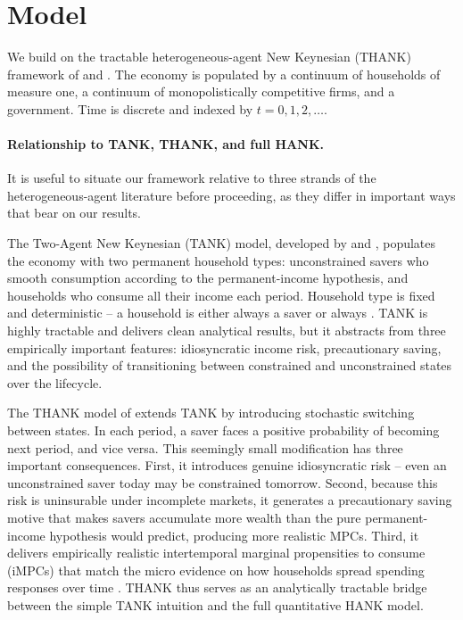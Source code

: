 \section{Model}\label{sec:model}

We build on the tractable heterogeneous-agent New Keynesian (THANK) framework
of \citet{Bilbiie2021} and \citet{Bilbiie2025}. The economy is populated by a
continuum of households of measure one, a continuum of monopolistically
competitive firms, and a government. Time is discrete and indexed by
$t=0,1,2,\dots$.

\paragraph{Relationship to TANK, THANK, and full HANK.}
It is useful to situate our framework relative to three strands of the
heterogeneous-agent literature before proceeding, as they differ in important
ways that bear on our results.

The Two-Agent New Keynesian (TANK) model, developed by \citet{Gali2007} and
\citet{Bilbiie2021}, populates the economy with two permanent household types:
unconstrained savers who smooth consumption according to the permanent-income
hypothesis, and \HtM{} households who consume all their income each period.
Household type is fixed and deterministic -- a household is either always a
saver or always \HtM. TANK is highly tractable and delivers clean analytical
results, but it abstracts from three empirically important features:
idiosyncratic income risk, precautionary saving, and the possibility of
transitioning between constrained and unconstrained states over the lifecycle.

The THANK model of \citet{Bilbiie2025} extends TANK by introducing stochastic
switching between states. In each period, a saver faces a positive probability
of becoming \HtM{} next period, and vice versa. This seemingly small
modification has three important consequences. First, it introduces genuine
idiosyncratic risk -- even an unconstrained saver today may be constrained
tomorrow. Second, because this risk is uninsurable under incomplete markets, it
generates a precautionary saving motive that makes savers accumulate more wealth
than the pure permanent-income hypothesis would predict, producing more
realistic MPCs. Third, it delivers empirically realistic intertemporal marginal
propensities to consume (iMPCs) that match the micro evidence on how households
spread spending responses over time \citep{Fagereng2021}. THANK thus serves as
an analytically tractable bridge between the simple TANK intuition and the full
quantitative HANK model.

